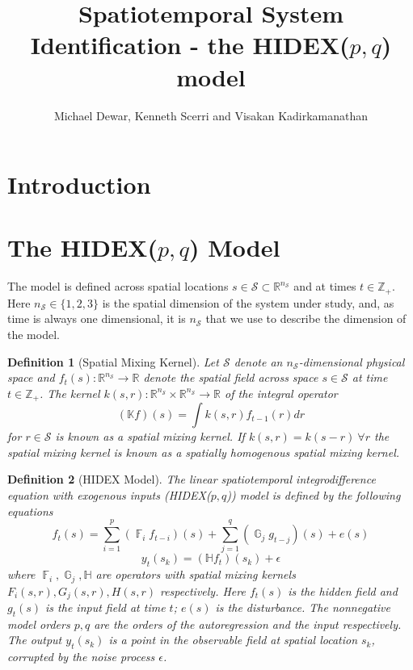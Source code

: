 \documentclass{IEEEtran}
\title{Spatiotemporal System Identification - the HIDEX($p,q$) model}
\author{Michael Dewar, Kenneth Scerri and Visakan Kadirkamanathan}
\DeclareMathOperator{\F}{\mathbb{F}}
\DeclareMathOperator{\G}{\mathbb{G}}
\DeclareMathOperator{\onto}{\rightarrow}
\newtheorem{definition}{Definition}
\begin{document}
\maketitle

\section{Introduction}

\section{The HIDEX($p,q$) Model}
\label{sec:model}

The model is defined across spatial locations $s \in \mathcal{S} \subset \mathbb{R}^{n_\mathcal{S}}$ and at times $t \in \mathbb{Z}_+$. Here $n_\mathcal{S} \in \{1,2,3\}$ is the spatial dimension of the system under study, and, as time is always one dimensional, it is $n_\mathcal{S}$ that we use to describe the dimension of the model. 

\begin{definition}[Spatial Mixing Kernel]
	Let $\mathcal{S}$ denote an $n_\mathcal{S}$-dimensional physical space and $f_t(s): \mathbb{R}^{n_\mathcal{S}} \onto \mathbb{R}$ denote the spatial field across space $s \in \mathcal{S}$ at time $t \in \mathbb{Z}_+$. The kernel $k(s,r): \mathbb{R}^{n_\mathcal{S}} \times \mathbb{R}^{n_\mathcal{S}} \onto \mathbb{R}$ of the integral operator
	\begin{equation}
		(\mathbb{K}f)(s) = \int k(s,r) f_{t-1}(r) dr
	\end{equation}
	for $r \in \mathcal{S}$ is known as a \emph{spatial mixing kernel}. If $k(s,r) = k(s-r) ~ \forall r$ the spatial mixing kernel is known as a \emph{spatially homogenous spatial mixing kernel}.
\end{definition}

\begin{definition}[HIDEX Model]
	\label{def:hidex}
	The linear spatiotemporal integrodifference equation with exogenous inputs (HIDEX($p,q$)) model is defined by the following equations
	\begin{equation}
		\label{eqn:hidex-hidden}
	f_t(s)= \sum_{i=1}^{p} (\F_i f_{t-i})(s) + \sum_{j=1}^{q}(\G_j g_{t-j})(s)+e(s)
	\end{equation}
	\begin{equation}
	\label{eqn:hidex-obs}
	y_t(s_k) = (\mathbb{H}f_t)(s_k) + \epsilon
	\end{equation}
	where $\F_i,\G_j,\mathbb{H}$ are operators with spatial mixing kernels $F_i(s,r), G_j(s,r), H(s,r)$ respectively. Here $f_t(s)$ is the hidden field and $g_{t}(s)$ is the input field at time $t$; $e(s)$ is the disturbance. The nonnegative model orders $p,q$ are the orders of the autoregression and the input respectively. The output $y_t(s_k)$ is a point in the observable field at spatial location $s_k$, corrupted by the noise process $\epsilon$.
\end{definition}
\end{document}
